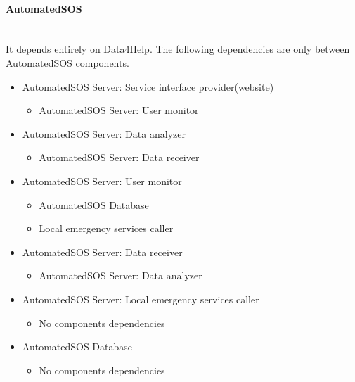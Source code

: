 		\paragraph{AutomatedSOS}\mbox{}\\
		It depends entirely on Data4Help. The following dependencies are only between AutomatedSOS components.
		\begin{itemize}
			\item{AutomatedSOS Server: Service interface provider(website)}
			\begin{itemize}\item{AutomatedSOS Server: User monitor}\end{itemize}

			\item{AutomatedSOS Server: Data analyzer}
			\begin{itemize}\item{AutomatedSOS Server: Data receiver}\end{itemize}

			\item{AutomatedSOS Server: User monitor}
			\begin{itemize}\item{AutomatedSOS Database}\item{Local emergency services caller}\end{itemize}

			\item{AutomatedSOS Server: Data receiver}
			\begin{itemize}\item{AutomatedSOS Server: Data analyzer}\end{itemize}

			\item{AutomatedSOS Server: Local emergency services caller}
			\begin{itemize}\item{No components dependencies}\end{itemize}

			\item{AutomatedSOS Database}
			\begin{itemize}\item{No components dependencies}\end{itemize}
		\end{itemize}

